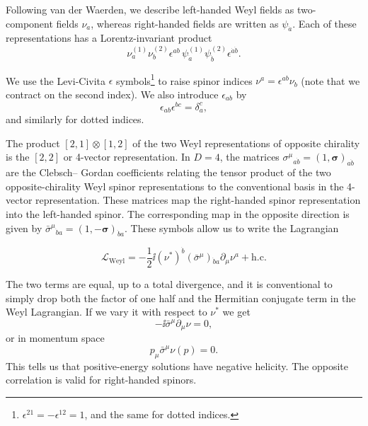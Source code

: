 Following van der Waerden, we describe left-handed Weyl fields as two-component
fields $\nu_a$, whereas right-handed fields are written as $\psi_{\dot a}$. Each of these representations
has a Lorentz-invariant product
\begin{equation*}
  \nu_a^{(1)}\nu_b^{(2)}\epsilon^{ab}\,\psi_{\dot a}^{(1)}\psi_{\dot b}^{(2)}\epsilon^{\dot a\dot b}.
\end{equation*}

We use the Levi-Civita $\epsilon$ symbols\footnote[5]{$\epsilon^{21}=-\epsilon^{12}=1$, and the same for dotted indices.} to raise spinor indices $\nu^a=\epsilon^{ab}\nu_b$ (note that we
contract on the second index). We also introduce $\epsilon_{ab}$ by
\begin{equation*}
  \epsilon_{ab}\epsilon^{bc}=\delta_a^c,
\end{equation*}
and similarly for dotted indices.

The product $[2,1]\otimes[1,2]$ of the two Weyl representations of opposite chirality is
the $[2,2]$ or 4-vector representation. In $D=4$, the matrices
$\sigma^\mu{}_{a\dot b}=(1,\boldsymbol\sigma)_{a\dot b}$ are the Clebsch--
Gordan coefficients relating the tensor product of the two opposite-chirality Weyl
spinor representations to the conventional basis in the 4-vector representation. These
matrices map the right-handed spinor representation into the left-handed spinor. The
corresponding map in the opposite direction is given by $\bar\sigma^\mu{}_{\dot b a}=(1,-\boldsymbol\sigma)_{\dot b a}$. These symbols
allow us to write the Lagrangian

\begin{equation}
  \mathcal{L}_{\mathrm{Weyl}}=-\frac12\ii(\nu^*)^{\dot b}(\bar\sigma^\mu){}_{\dot b a}\partial_\mu\nu^a+\mathrm{h.c.}
  \label{eq:5.1}
\end{equation}

The two terms are equal, up to a total divergence, and it is conventional to simply drop
both the factor of one half and the Hermitian conjugate term in the Weyl Lagrangian.
If we vary it with respect to $\nu^*$ we get
\begin{equation*}
  -\ii\bar\sigma^\mu\partial_\mu\nu=0,
\end{equation*}
or in momentum space
\begin{equation*}
  p_\mu\bar\sigma^\mu\nu(p)=0.
\end{equation*}
This tells us that positive-energy solutions have negative helicity. The opposite
correlation is valid for right-handed spinors.

